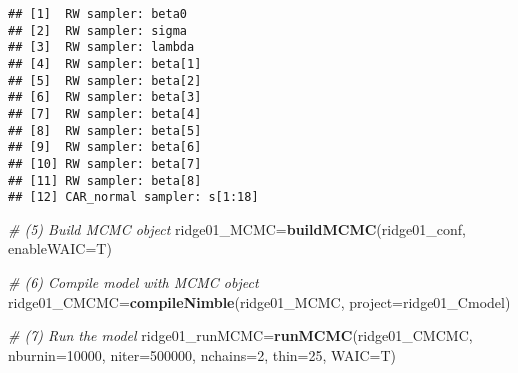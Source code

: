 \documentclass[]{article}
\newenvironment{Shaded}{\begin{snugshade}}{\end{snugshade}}
\newcommand{\CommentTok}[1]{\textcolor[rgb]{0.56,0.35,0.01}{\textit{#1}}}
\newcommand{\DataTypeTok}[1]{\textcolor[rgb]{0.13,0.29,0.53}{#1}}
\newcommand{\DecValTok}[1]{\textcolor[rgb]{0.00,0.00,0.81}{#1}}
\newcommand{\KeywordTok}[1]{\textcolor[rgb]{0.13,0.29,0.53}{\textbf{#1}}}
\newcommand{\NormalTok}[1]{#1}
\newcommand{\OperatorTok}[1]{\textcolor[rgb]{0.81,0.36,0.00}{\textbf{#1}}}
\newcommand{\StringTok}[1]{\textcolor[rgb]{0.31,0.60,0.02}{#1}}
\begin{document}
\begin{Shaded}
\end{Shaded}

\begin{verbatim}
## [1]  RW sampler: beta0
## [2]  RW sampler: sigma
## [3]  RW sampler: lambda
## [4]  RW sampler: beta[1]
## [5]  RW sampler: beta[2]
## [6]  RW sampler: beta[3]
## [7]  RW sampler: beta[4]
## [8]  RW sampler: beta[5]
## [9]  RW sampler: beta[6]
## [10] RW sampler: beta[7]
## [11] RW sampler: beta[8]
## [12] CAR_normal sampler: s[1:18]
\end{verbatim}

\begin{Shaded}
\begin{Highlighting}[]
\CommentTok{# (5) Build MCMC object}
\NormalTok{ridge01_MCMC=}\KeywordTok{buildMCMC}\NormalTok{(ridge01_conf, }\DataTypeTok{enableWAIC=}\NormalTok{T)}

\CommentTok{# (6) Compile model with MCMC object}
\NormalTok{ridge01_CMCMC=}\KeywordTok{compileNimble}\NormalTok{(ridge01_MCMC, }\DataTypeTok{project=}\NormalTok{ridge01_Cmodel)}

\CommentTok{# (7) Run the model}
\NormalTok{ridge01_runMCMC=}\KeywordTok{runMCMC}\NormalTok{(ridge01_CMCMC, }\DataTypeTok{nburnin=}\DecValTok{10000}\NormalTok{, }\DataTypeTok{niter=}\DecValTok{500000}\NormalTok{, }\DataTypeTok{nchains=}\DecValTok{2}\NormalTok{, }\DataTypeTok{thin=}\DecValTok{25}\NormalTok{, }\DataTypeTok{WAIC=}\NormalTok{T)}
\end{Highlighting}
\end{Shaded}
\end{document}
